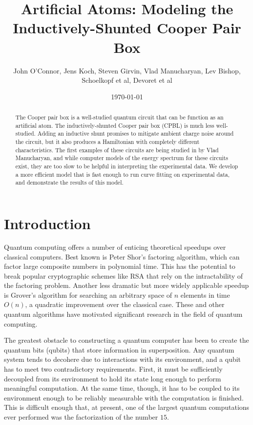 \documentclass[twocolumn]{revtex4}
\begin{document}
\title{Artificial Atoms: Modeling the Inductively-Shunted Cooper Pair
  Box}
\author{John O'Connor, Jens Koch, Steven Girvin, Vlad Manucharyan, Lev
  Bishop, Schoelkopf et al, Devoret et al}

\date{\today}

\begin{abstract}
  The Cooper pair box is a well-studied quantum circuit that can be
  function as an artificial atom. The inductively-shunted Cooper pair
  box (CPBL) is much less well-studied. Adding an inductive shunt
  promises to mitigate ambient charge noise around the circuit, but it
  also produces a Hamiltonian with completely different
  characteristics. The first examples of these circuits are being
  studied in by Vlad Manucharyan, and while computer models of the
  energy spectrum for these circuits exist, they are too slow to be
  helpful in interpreting the experimental data. We develop a more
  efficient model that is fast enough to run curve fitting on
  experimental data, and demonstrate the results of this model.
\end{abstract}

\maketitle

\section{Introduction}

Quantum computing offers a number of enticing theoretical speedups
over classical computers. Best known is Peter Shor's factoring
algorithm, which can factor large composite numbers in polynomial
time. This has the potential to break popular cryptographic schemes
like RSA that rely on the intractability of the factoring
problem. Another less dramatic but more widely applicable speedup is
Grover's algorithm for searching an arbitrary space of $n$ elements in
time $O(n)$, a quadratic improvement over the classical case. These
and other quantum algorithms have motivated significant research in
the field of quantum computing.

The greatest obstacle to constructing a quantum computer has been to
create the quantum bits (qubits) that store information in
superposition. Any quantum system tends to decohere due to
interactions with its environment, and a qubit has to meet two
contradictory requirements. First, it must be sufficiently decoupled
from its environment to hold its state long enough to perform
meaningful computation. At the same time, though, it has to be coupled
to its environment enough to be reliably measurable with the
computation is finished. This is difficult enough that, at present,
one of the largest quantum computations ever performed
\cite{Vandersypen} was the factorization of the number $15$.
\end{document}
